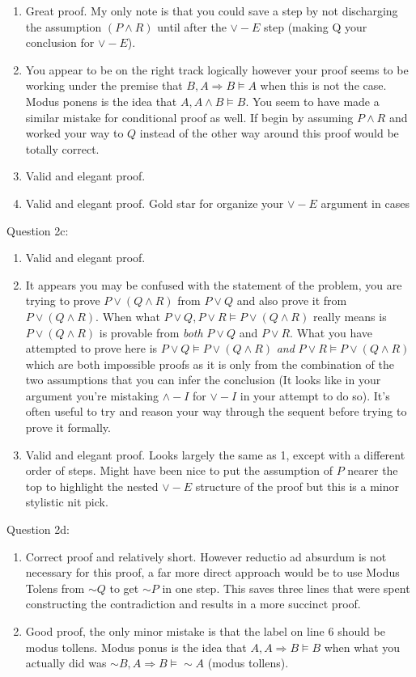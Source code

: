 \documentclass[11pt] {article}
\begin{document}
\begin{enumerate}
\item Great proof. My only note is that you could save a step by not discharging the assumption $(P \land R)$ until after the $\lor -E$ step (making Q your conclusion for $\lor -E$).
\item You appear to be on the right track logically however your proof seems to be working under the premise that $B,A\Rightarrow B \vDash A$ when this is not the case. Modus ponens is the idea that $A,A\land B \vDash B$. You seem to have made a similar mistake for conditional proof as well. If begin by assuming $P\land R$ and worked your way to $Q$ instead of the other way around this proof would be totally correct.
\item Valid and elegant proof.
\item Valid and elegant proof.  Gold star for organize your $\lor -E$ argument in cases
\end{enumerate}
Question 2c:
\begin{enumerate}
\item Valid and elegant proof. 
\item It appears you may be confused with the statement of the problem, you are trying to prove $P\lor (Q\land R)$ from $P \lor Q $ and also prove it from $P \lor (Q \land R)$. When what $P\lor Q, P\lor R \vDash P \lor (Q\land R)$ really means is $P\lor (Q\land R)$ is provable from \textit{both} $P\lor Q$ and $P\lor R$. What you have attempted to prove here is $P\lor Q \vDash P \lor (Q \land R)$ \textit{and} $P\lor R \vDash P \lor (Q \land R)$  which are both impossible proofs as it is only from the combination of the two assumptions that you can infer the conclusion (It looks like in your argument you're mistaking $\land-I$ for $\lor-I$ in your attempt to do so). It's often useful to try and reason your way through the sequent before trying to prove it formally.
\item Valid and elegant proof. Looks largely the same as 1, except with a different order of steps. Might have been nice to put the assumption of $P$ nearer the top to highlight the nested  $\lor -E$ structure of the proof but this is a minor stylistic nit pick.
\end{enumerate}
Question 2d:
\begin{enumerate}
\item Correct proof and relatively short. However reductio ad absurdum is not necessary for this proof, a far more direct approach would be to use Modus Tolens from $\sim Q$ to get $\sim P$ in one step. This saves three lines that were spent constructing the contradiction and results in a more succinct proof. 
\item Good proof, the only minor mistake is that the label on line 6 should be modus tollens. Modus ponus is the idea that $A,A \Rightarrow B\vDash B$ when what you actually did was $\sim B, A \Rightarrow B \vDash \sim A$  (modus tollens).
\end{enumerate}
\end{document}
